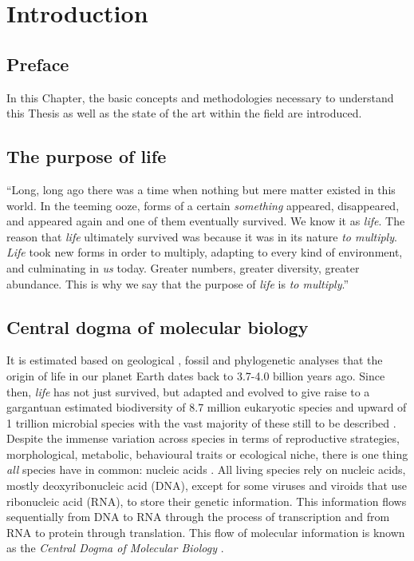 \chapter{Introduction}

\section*{Preface}

In this Chapter, the basic concepts and methodologies necessary to understand this Thesis as well as the state of the art within the field are introduced.

\section{The purpose of life}

``Long, long ago there was a time when nothing but mere matter existed in this world. In the teeming ooze, forms of a certain \textit{something} appeared, disappeared, and appeared again and one of them eventually survived. We know it as \textit{life}. The reason that \textit{life} ultimately survived was because it was in its nature \textit{to multiply}. \textit{Life} took new forms in order to multiply, adapting to every kind of environment, and culminating in \textit{us} today. Greater numbers, greater diversity, greater abundance. This is why we say that the purpose of \textit{life} is \textit{to multiply}.'' \cite{ISAYAMA_2021}

\section{Central dogma of molecular biology}

It is estimated based on geological \cite{SCHIDLOWSKI_1979_LIFE}, fossil \cite{SCHOPF_2007_LIFE} and phylogenetic \cite{BETTS_2018_LIFE} analyses that the origin of life in our planet Earth dates back to 3.7-4.0 billion years ago. Since then, \textit{life} has not just survived, but adapted and evolved to give raise to a gargantuan estimated biodiversity of 8.7 million eukaryotic species \cite{MORA_2011_SPECIES} and upward of 1 trillion microbial species \cite{HUG_2016_SPECIES, LOCEY_2016_SPECIES} with the vast majority of these still to be described \cite{COSTELLO_2013_SPECIES}. Despite the immense variation across species in terms of reproductive strategies, morphological, metabolic, behavioural traits or ecological niche, there is one thing \textit{all} species have in common: nucleic acids \cite{KOONIN_2011_LIFE}. All living species rely on nucleic acids, mostly deoxyribonucleic acid (DNA), except for some viruses \cite{KOONIN_2006_VIRUS} and viroids \cite{NAVARRO_2021_VIROIDS} that use ribonucleic acid (RNA), to store their genetic information. This information flows sequentially from DNA to RNA through the process of transcription and from RNA to protein through translation. This flow of molecular information is known as the \textit{Central Dogma of Molecular Biology} \cite{CRICK_1958_DOGMA, CRICK_1970_DOGMA}.


